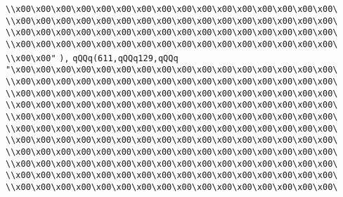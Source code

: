 \verb|\\x00\x00\x00\x00\x00\x00\x00\x00\x00\x00\x00\x00\x00\x00\x00\x00\|\newline
\verb|\\x00\x00\x00\x00\x00\x00\x00\x00\x00\x00\x00\x00\x00\x00\x00\x00\|\newline
\verb|\\x00\x00\x00\x00\x00\x00\x00\x00\x00\x00\x00\x00\x00\x00\x00\x00\|\newline
\verb|\\x00\x00\x00\x00\x00\x00\x00\x00\x00\x00\x00\x00\x00\x00\x00\x00\|\newline
\verb|\\x00\x00"|\newline
\verb|),|\newline
\verb|qQQq(611,qQQq129,qQQq|\newline
\verb|"\x00\x00\x00\x00\x00\x00\x00\x00\x00\x00\x00\x00\x00\x00\x00\x00\|\newline
\verb|\\x00\x00\x00\x00\x00\x00\x00\x00\x00\x00\x00\x00\x00\x00\x00\x00\|\newline
\verb|\\x00\x00\x00\x00\x00\x00\x00\x00\x00\x00\x00\x00\x00\x00\x00\x00\|\newline
\verb|\\x00\x00\x00\x00\x00\x00\x00\x00\x00\x00\x00\x00\x00\x00\x00\x00\|\newline
\verb|\\x00\x00\x00\x00\x00\x00\x00\x00\x00\x00\x00\x00\x00\x00\x00\x00\|\newline
\verb|\\x00\x00\x00\x00\x00\x00\x00\x00\x00\x00\x00\x00\x00\x00\x00\x00\|\newline
\verb|\\x00\x00\x00\x00\x00\x00\x00\x00\x00\x00\x00\x00\x00\x00\x00\x00\|\newline
\verb|\\x00\x00\x00\x00\x00\x00\x00\x00\x00\x00\x00\x00\x00\x00\x00\x00\|\newline
\verb|\\x00\x00\x00\x00\x00\x00\x00\x00\x00\x00\x00\x00\x00\x00\x00\x00\|\newline
\verb|\\x00\x00\x00\x00\x00\x00\x00\x00\x00\x00\x00\x00\x00\x00\x00\x00\|\newline
\verb|\\x00\x00\x00\x00\x00\x00\x00\x00\x00\x00\x00\x00\x00\x00\x00\x00\|\newline
